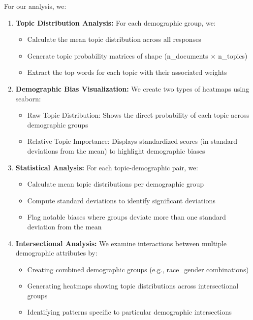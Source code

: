 \documentclass{article}
\begin{document}
For our analysis, we:
\begin{enumerate}
    \item \textbf{Topic Distribution Analysis:} For each demographic group, we:
    \begin{itemize}
        \item Calculate the mean topic distribution across all responses
        \item Generate topic probability matrices of shape (n_documents × n_topics)
        \item Extract the top words for each topic with their associated weights
    \end{itemize}

    \item \textbf{Demographic Bias Visualization:} We create two types of heatmaps using seaborn:
    \begin{itemize}
        \item Raw Topic Distribution: Shows the direct probability of each topic across demographic groups
        \item Relative Topic Importance: Displays standardized scores (in standard deviations from the mean) to highlight demographic biases
    \end{itemize}

    \item \textbf{Statistical Analysis:} For each topic-demographic pair, we:
    \begin{itemize}
        \item Calculate mean topic distributions per demographic group
        \item Compute standard deviations to identify significant deviations
        \item Flag notable biases where groups deviate more than one standard deviation from the mean
    \end{itemize}

    \item \textbf{Intersectional Analysis:} We examine interactions between multiple demographic attributes by:
    \begin{itemize}
        \item Creating combined demographic groups (e.g., race_gender combinations)
        \item Generating heatmaps showing topic distributions across intersectional groups
        \item Identifying patterns specific to particular demographic intersections
    \end{itemize}


\end{enumerate}
\end{document}
